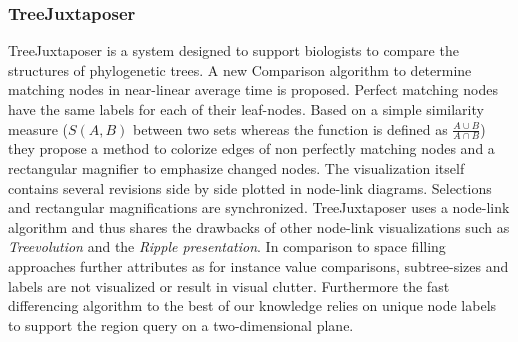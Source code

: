 



\subsubsection{TreeJuxtaposer\cite{munzner2003treejuxtaposer}}
TreeJuxtaposer is a system designed to support biologists to compare the structures of phylogenetic trees. A new Comparison algorithm to determine matching nodes in near-linear average time is proposed. Perfect matching nodes have the same labels for each of their leaf-nodes. Based on a simple similarity measure ($S(A,B)$ between two sets whereas the function is defined as $\frac{A \cup B}{A \cap B}$) they propose a method to colorize edges of non perfectly matching nodes and a rectangular magnifier to emphasize changed nodes. The visualization itself contains several revisions side by side plotted in node-link diagrams. Selections and rectangular magnifications are synchronized. TreeJuxtaposer uses a node-link algorithm and thus shares the drawbacks of other node-link visualizations such as \emph{Treevolution} and the \emph{Ripple presentation}. In comparison to space filling approaches further attributes as for instance value comparisons, subtree-sizes and labels are not visualized or result in visual clutter. Furthermore the fast differencing algorithm to the best of our knowledge relies on unique node labels to support the region query on a two-dimensional plane.


